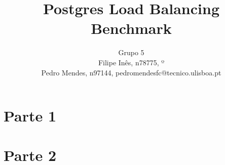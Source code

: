 \documentclass[runningheads]{llncs}
\begin{document}
%
\title{Postgres Load Balancing Benchmark}
%
%
\author{
Grupo 5 \\
Filipe Inês, n78775, º \\
Pedro Mendes, n97144, pedromendesfc@tecnico.ulisboa.pt
}

%
\maketitle              %
%
\begin{abstract}

\end{abstract}
%
%
%
\section{Parte 1}










\section{Parte 2}







%
%
%
% 
% 
%


\end{document}
